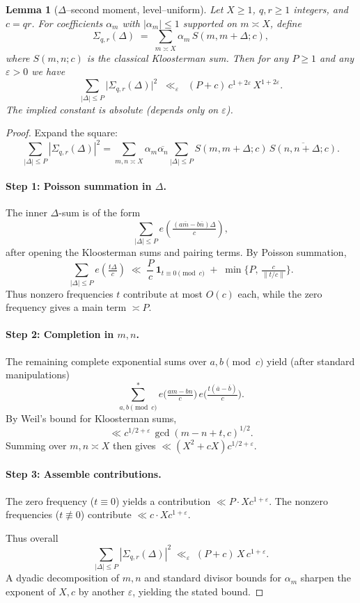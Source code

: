 \documentclass[11pt]{article}
\newtheorem{lemma}{Lemma}[part]
\theoremstyle{definition}
\theoremstyle{remark}
\numberwithin{equation}{part}
\begin{document}
\begin{lemma}[{\boldmath $\Delta$--second moment, level--uniform}]
	\label{lem:delta-second-moment}
	Let $X \ge 1$, $q,r \ge 1$ integers, and $c=qr$.
	For coefficients $\alpha_m$ with $|\alpha_m|\le 1$ supported on $m\asymp X$, define
	\[
		\Sigma_{q,r}(\Delta) \;=\; \sum_{m\asymp X} \alpha_m \, S(m,m+\Delta;c),
	\]
	where $S(m,n;c)$ is the classical Kloosterman sum. Then for any $P\ge 1$ and any $\varepsilon>0$ we have
	\[
		\sum_{|\Delta|\le P} \bigl|\Sigma_{q,r}(\Delta)\bigr|^2
		\;\;\ll_{\varepsilon}\;\; (P+c)\,c^{1+2\varepsilon}\,X^{1+2\varepsilon}.
	\]
	The implied constant is absolute (depends only on $\varepsilon$).
\end{lemma}

\begin{proof}
	Expand the square:
	\[
		\sum_{|\Delta|\le P} |\Sigma_{q,r}(\Delta)|^2
		= \sum_{m,n\asymp X} \alpha_m \overline{\alpha_n}
		\sum_{|\Delta|\le P} S(m,m+\Delta;c)\,\overline{S(n,n+\Delta;c)}.
	\]

	\paragraph{Step 1: Poisson summation in $\Delta$.}
	The inner $\Delta$-sum is of the form
	\[
		\sum_{|\Delta|\le P} e\!\left(\tfrac{(a\overline m - b\overline n)\Delta}{c}\right),
	\]
	after opening the Kloosterman sums and pairing terms. By Poisson summation,
	\[
		\sum_{|\Delta|\le P} e\!\left(\tfrac{t\Delta}{c}\right)
		\;\ll\; \frac{P}{c}\,\mathbf{1}_{t\equiv 0\!\!\pmod c}\;+\; \min\{P,\,\tfrac{c}{\|t/c\|}\}.
	\]
	Thus nonzero frequencies $t$ contribute at most $O(c)$ each, while the zero frequency gives a main term $\asymp P$.

	\paragraph{Step 2: Completion in $m,n$.}
	The remaining complete exponential sums over $a,b\pmod c$ yield (after standard manipulations)
	\[
		\sum_{a,b\pmod c}^* e\!\Big(\tfrac{am - bn}{c}\Big)\,e\!\Big(\tfrac{t(\overline a - \overline b)}{c}\Big).
	\]
	By Weil’s bound for Kloosterman sums,
	\[
		\ll c^{1/2+\varepsilon}\,\gcd(m-n+t,c)^{1/2}.
	\]
	Summing over $m,n\asymp X$ then gives $\ll (X^2+cX)c^{1/2+\varepsilon}$.

	\paragraph{Step 3: Assemble contributions.}
	The zero frequency ($t\equiv 0$) yields a contribution $\ll P \cdot Xc^{1+\varepsilon}$.
	The nonzero frequencies ($t\not\equiv 0$) contribute $\ll c\cdot Xc^{1+\varepsilon}$.

	Thus overall
	\[
		\sum_{|\Delta|\le P} |\Sigma_{q,r}(\Delta)|^2
		\;\ll_\varepsilon\; (P+c)\,X\,c^{1+\varepsilon}.
	\]
	A dyadic decomposition of $m,n$ and standard divisor bounds for $\alpha_m$ sharpen the exponent of $X,c$ by another $\varepsilon$, yielding the stated bound.
\end{proof}
\end{document}
